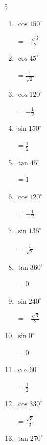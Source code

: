 \begin{multicols}{5}
\begin{enumerate}
        $\displaystyle なし$

  \item $\displaystyle \cos{150^\circ}$

        $\displaystyle =-\frac{\sqrt{3}}{2}$

  \item $\displaystyle \cos{45^\circ}$

        $\displaystyle =\frac{1}{\sqrt{2}}$

  \item $\displaystyle \cos{120^\circ}$

        $\displaystyle =-\frac{1}{2}$

  \item $\displaystyle \sin{150^\circ}$

        $\displaystyle =\frac{1}{2}$

  \item $\displaystyle \tan{45^\circ}$

        $\displaystyle =1$

  \item $\displaystyle \cos{120^\circ}$

        $\displaystyle =-\frac{1}{2}$

  \item $\displaystyle \sin{135^\circ}$

        $\displaystyle =\frac{1}{\sqrt{2}}$

  \item $\displaystyle \tan{360^\circ}$

        $\displaystyle =0$

  \item $\displaystyle \sin{240^\circ}$

        $\displaystyle =-\frac{\sqrt{3}}{2}$

  \item $\displaystyle \sin{0^\circ}$

        $\displaystyle =0$

\columnbreak %

\resetques

  \item $\displaystyle \cos{60^\circ}$

        $\displaystyle =\frac{1}{2}$

  \item $\displaystyle \cos{330^\circ}$

        $\displaystyle =\frac{\sqrt{3}}{2}$

  \item $\displaystyle \tan{270^\circ}$


\end{enumerate}
\end{multicols}
